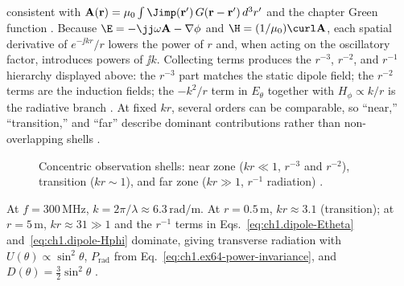 consistent with $\mathbf{A}(\mathbf{r})=\mu_0\int \Jimp(\mathbf{r}')\,G(\mathbf{r}-\mathbf{r}')\,d^{3}r'$ and the chapter Green function \cite{stratton1941,harrington2001,orfanidis2014}. Because $\E=-\jj\omega\mathbf{A}-\nabla\phi$ and $\H=(1/\mu_0)\curl\mathbf{A}$, each spatial derivative of $e^{-\jj kr}/r$ lowers the power of $r$ and, when acting on the oscillatory factor, introduces powers of $\jj k$. Collecting terms produces the $r^{-3}$, $r^{-2}$, and $r^{-1}$ hierarchy displayed above: the $r^{-3}$ part matches the static dipole field; the $r^{-2}$ terms are the induction fields; the $-k^2/r$ term in $E_\theta$ together with $H_\phi\propto k/r$ is the radiative branch \cite{stratton1941}. At fixed $kr$, several orders can be comparable, so ``near,'' ``transition,'' and ``far'' describe dominant contributions rather than non-overlapping shells \cite{stratton1941,poynting1884}.

\begin{figure}[t]
\centering
\VolIPhysFig{\VolIPhysDipoleThreeZones}
\caption{Concentric observation shells: near zone ($kr\ll1$, $r^{-3}$ and $r^{-2}$), transition ($kr\sim1$), and far zone ($kr\gg1$, $r^{-1}$ radiation) \cite{stratton1941,poynting1884}.}
\label{fig:ch1.dipole-three-zones}
\end{figure}

\begin{example}
\label{ex:ch1.dipole-kr}
At $f=300\,\mathrm{MHz}$, $k=2\pi/\lambda\approx6.3\,\mathrm{rad/m}$. At $r=0.5\,\mathrm{m}$, $kr\approx3.1$ (transition); at $r=5\,\mathrm{m}$, $kr\approx31\gg1$ and the $r^{-1}$ terms in Eqs.~\eqref{eq:ch1.dipole-Etheta} and~\eqref{eq:ch1.dipole-Hphi} dominate, giving transverse radiation with $U(\theta)\propto\sin^2\theta$, $P_{\mathrm{rad}}$ from Eq.~\eqref{eq:ch1.ex64-power-invariance}, and $D(\theta)=\tfrac32\sin^2\theta$ \cite{stratton1941,harrington2001}.
\end{example}


